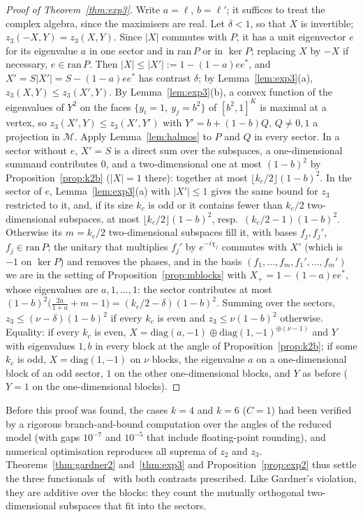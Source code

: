 \documentclass[11pt]{article}
\newcommand{\M}{\mathcal{M}}
\theoremstyle{plain}
\theoremstyle{definition}
\theoremstyle{remark}
\begin{document}
\begin{proof}[Proof of Theorem~\ref{thm:exp3}]
Write $a=\ell$, $b=\ell'$; it suffices to treat the complex algebra, since the maximisers are real. Let $\delta<1$, so that
$X$ is invertible; $z_3(-X,Y)=z_3(X,Y)$. Since $|X|$ commutes with $P$, it has a unit eigenvector $e$ for its eigenvalue $a$
in one sector and in $\mathrm{ran}\,P$ or in $\ker P$; replacing $X$ by $-X$ if necessary, $e\in\mathrm{ran}\,P$. Then
$|X|\le|X'|:=1-(1-a)ee^*$, and $X'=S|X'|=S-(1-a)ee^*$ has contrast $\delta$; by Lemma~\ref{lem:exp3}(a),
$z_3(X,Y)\le z_3(X',Y)$. By Lemma~\ref{lem:exp3}(b), a convex function of the eigenvalues of $Y^2$ on the faces
$\{y_i=1,\ y_j=b^2\}$ of $[b^2,1]^K$ is maximal at a vertex, so $z_3(X',Y)\le z_3(X',Y')$ with $Y'=b+(1-b)Q$, $Q\ne0,1$ a
projection in $\M$. Apply Lemma~\ref{lem:halmos} to $P$ and $Q$ in every sector. In a sector without $e$, $X'=S$ is a
direct sum over the subspaces, a one-dimensional summand contributes $0$, and a two-dimensional one at most $(1-b)^2$ by
Proposition~\ref{prop:k2b} ($|X|=1$ there): together at most $\lfloor k_c/2\rfloor(1-b)^2$. In the sector of $e$,
Lemma~\ref{lem:exp3}(a) with $|X'|\le1$ gives the same bound for $z_3$ restricted to it, and, if its size $k_c$ is odd or it
contains fewer than $k_c/2$ two-dimensional subspaces, at most $\lfloor k_c/2\rfloor(1-b)^2$, resp.\ $(k_c/2-1)(1-b)^2$.
Otherwise its $m=k_c/2$ two-dimensional subspaces fill it, with bases $f_j,f_j'$, $f_j\in\mathrm{ran}\,P$; the unitary that
multiplies $f_j'$ by $e^{-i\chi_j}$ commutes with $X'$ (which is $-1$ on $\ker P$) and removes the phases, and in the basis
$(f_1,\dots,f_m,f_1',\dots,f_m')$ we are in the setting of Proposition~\ref{prop:mblocks} with $X_+=1-(1-a)ee^*$, whose
eigenvalues are $a,1,\dots,1$: the sector contributes at most $(1-b)^2\bigl(\frac{2a}{1+a}+m-1\bigr)=(k_c/2-\delta)(1-b)^2$.
Summing over the sectors, $z_3\le(\nu-\delta)(1-b)^2$ if every $k_c$ is even and $z_3\le\nu(1-b)^2$ otherwise. Equality: if every
$k_c$ is even, $X=\mathrm{diag}(a,-1)\oplus\mathrm{diag}(1,-1)^{\oplus(\nu-1)}$ and $Y$ with eigenvalues $1,b$ in every block at
the angle of Proposition~\ref{prop:k2b}; if some $k_c$ is odd, $X=\mathrm{diag}(1,-1)$ on $\nu$ blocks, the eigenvalue $a$ on a
one-dimensional block of an odd sector, $1$ on the other one-dimensional blocks, and $Y$ as before ($Y=1$ on the
one-dimensional blocks).
\end{proof}

\noindent Before this proof was found, the cases $k=4$ and $k=6$ ($C=1$) had been verified by a rigorous branch-and-bound
computation over the angles of the reduced model (with gaps $10^{-7}$ and $10^{-5}$ that include floating-point
rounding), and numerical optimisation reproduces all suprema of $z_2$ and $z_3$. Theorems~\ref{thm:gardner2} and~\ref{thm:exp3} and Proposition~\ref{prop:exp2} thus settle
the three functionals of~\cite[Sect.~5]{abed2024} with both contrasts prescribed. Like Gardner's violation, they are
additive over the blocks: they count the mutually orthogonal two-dimensional subspaces that fit into the sectors.
\end{document}
